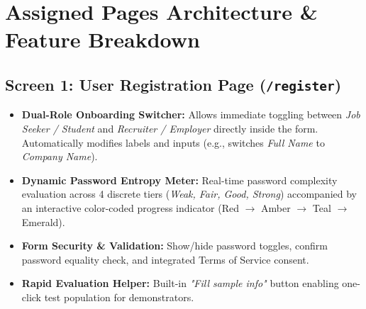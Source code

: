 \documentclass[11pt,a4paper]{article}
\begin{document}
\section{Assigned Pages Architecture \& Feature Breakdown}

\subsection{Screen 1: User Registration Page (\texttt{/register})}
\begin{itemize}[leftmargin=1.5em, itemsep=0.3em]
    \item \textbf{Dual-Role Onboarding Switcher:} Allows immediate toggling between \textit{Job Seeker / Student} and \textit{Recruiter / Employer} directly inside the form. Automatically modifies labels and inputs (e.g., switches \textit{Full Name} to \textit{Company Name}).
    \item \textbf{Dynamic Password Entropy Meter:} Real-time password complexity evaluation across 4 discrete tiers (\textit{Weak, Fair, Good, Strong}) accompanied by an interactive color-coded progress indicator (Red $\rightarrow$ Amber $\rightarrow$ Teal $\rightarrow$ Emerald).
    \item \textbf{Form Security \& Validation:} Show/hide password toggles, confirm password equality check, and integrated Terms of Service consent.
    \item \textbf{Rapid Evaluation Helper:} Built-in \textit{"Fill sample info"} button enabling one-click test population for demonstrators.
\end{itemize}
\end{document}
